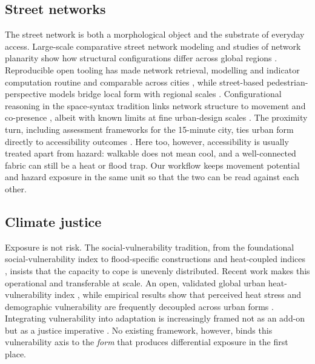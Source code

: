 \subsection{Street networks}
\label{sec:bg-network}
The street network is both a morphological object and the substrate of everyday
access. Large-scale comparative street network modeling and studies of network
planarity show how structural configurations differ across global regions
\citep{boeing2020MultiScale, boeing2020PlanaritStreet}. Reproducible open tooling
has made network retrieval, modelling and indicator computation routine and
comparable across cities \citep{boeing2017Osmnx, boeing2022StreetNetwork,
boeing2025ModelingNetworks}, while street-based pedestrian-perspective models
bridge local form with regional scales \citep{araldi2019FromStreet}. Configurational
reasoning in the space-syntax tradition links network structure to movement and
co-presence \citep{hillier1984SocialLogic}, albeit with known limits at fine
urban-design scales \citep{pafka2020LimitsSpace}. The proximity turn, including
assessment frameworks for the 15-minute city, ties urban form directly to accessibility
outcomes \citep{wangH2025FifteenMinute}. Here too, however, accessibility is
usually treated apart from hazard: walkable does not mean cool, and a
well-connected fabric can still be a heat or flood trap. Our workflow keeps
movement potential and hazard exposure in the same unit so that the two can be
read against each other.

\subsection{Climate justice}
\label{sec:bg-vulnerability}
Exposure is not risk. The social-vulnerability tradition, from the foundational
social-vulnerability index \citep{cutter2003SocialVulnerab} to flood-specific
constructions \citep{aroca2017ConstrucIntegrat} and heat-coupled indices
\citep{sabrin2020DevelopiVulnerab}, insists that the capacity to cope is unevenly
distributed. Recent work makes this operational and transferable at scale. An
open, validated global urban heat-vulnerability index
\citep{turner2025Guhvi}, while empirical results show that perceived heat stress and
demographic vulnerability are frequently decoupled across urban forms
\citep{iqbal2025HeatStress}. Integrating vulnerability into adaptation is
increasingly framed not as an add-on but as a justice imperative
\citep{neumann2026ClimateJustice}. No existing framework, however, binds this vulnerability axis to the
\emph{form} that produces differential exposure in the first place.

